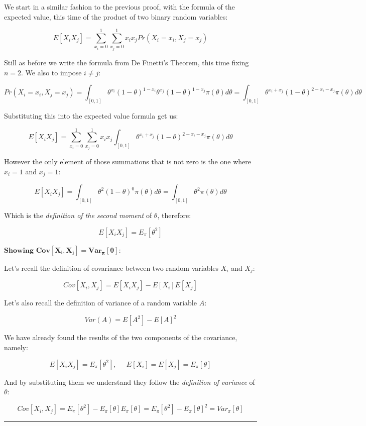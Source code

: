\documentclass[
]{article}
\begin{document}
We start in a similar fashion to the previous proof, with the formula of
the expected value, this time of the product of two binary random
variables:

\[
E[X_iX_j] = 
\sum_{x_i=0}^1 \sum_{x_j=0}^1 x_i x_j Pr(X_i=x_i,X_j=x_j)
\]

Still as before we write the formula from De Finetti's Theorem, this
time fixing \(n = 2\). We also to impose \(i \neq j\):

\[
Pr(X_i=x_i,X_j=x_j) =
\int_{[0,1]} \theta^{x_i}(1 - \theta)^{1 - x_i} \theta^{x_j}(1 - \theta)^{1 - x_j} \pi(\theta) d\theta =
\int_{[0,1]} \theta^{x_i + x_j}(1 - \theta)^{2 - x_i - x_j} \pi(\theta)d\theta
\]

Substituting this into the expected value formula get us:

\[
E[X_iX_j] =
\sum_{x_i=0}^1 \sum_{x_j=0}^1 x_i x_j \int_{[0,1]} \theta^{x_i + x_j}(1 - \theta)^{2 - x_i - x_j} \pi(\theta)d\theta
\]

However the only element of those summations that is not zero is the one
where \(x_i = 1\) and \(x_j = 1\):

\[
E[X_iX_j] =
\int_{[0,1]} \theta^{2}(1 - \theta)^{0} \pi(\theta)d\theta =
\int_{[0,1]} \theta^{2} \pi(\theta)d\theta
\]

Which is the \emph{definition of the second moment} of \(\theta\),
therefore:

\[
E[X_iX_j] = E_\pi[\theta^2]
\]

\(\textbf{Showing } \mathbf{Cov[X_i,X_j]=Var_{\pi}[\theta]}\):

Let's recall the definition of covariance between two random variables
\(X_i\) and \(X_j\):

\[
Cov[X_i,X_j] = E[X_iX_j] - E[X_i] E[X_j]
\]

Let's also recall the definition of variance of a random variable \(A\):

\[
Var(A) = E[A^2] - E[A]^2
\]

We have already found the results of the two components of the
covariance, namely:

\[
E[X_iX_j] = E_\pi[\theta^2], \;\;\;\;\;
E[X_i] = E[X_j] = E_\pi[\theta]
\]

And by substituting them we understand they follow the \emph{definition
of variance} of \(\theta\):

\[
Cov[X_i,X_j] =
E_\pi[\theta^2] - E_\pi[\theta]E_\pi[\theta] =
E_\pi[\theta^2] - E_\pi[\theta]^2 =
Var_\pi[\theta]
\]

\begin{center}\rule{0.5\linewidth}{0.5pt}\end{center}
\end{document}
